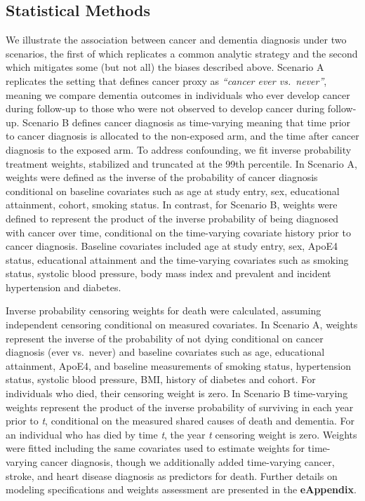 \documentclass[
]{book}
\begin{document}
\hypertarget{statistical-methods}{%
\subsection{Statistical Methods}\label{statistical-methods}}

We illustrate the association between cancer and dementia diagnosis under two scenarios, the first of which replicates a common analytic strategy and the second which mitigates some (but not all) the biases described above. Scenario A replicates the setting that defines cancer proxy as \emph{``cancer ever vs.~never''}\autocite{driver2012}, meaning we compare dementia outcomes in individuals who ever develop cancer during follow-up to those who were not observed to develop cancer during follow-up. Scenario B defines cancer diagnosis as time-varying meaning that time prior to cancer diagnosis is allocated to the non-exposed arm, and the time after cancer diagnosis to the exposed arm. To address confounding, we fit inverse probability treatment weights, stabilized and truncated at the 99th percentile. In Scenario A, weights were defined as the inverse of the probability of cancer diagnosis conditional on baseline covariates such as age at study entry, sex, educational attainment, cohort, smoking status. In contrast, for Scenario B, weights were defined to represent the product of the inverse probability of being diagnosed with cancer over time, conditional on the time-varying covariate history prior to cancer diagnosis\autocite{hernan2000}. Baseline covariates included age at study entry, sex, ApoE4 status, educational attainment and the time-varying covariates such as smoking status, systolic blood pressure, body mass index and prevalent and incident hypertension and diabetes.

Inverse probability censoring weights for death were calculated, assuming independent censoring conditional on measured covariates. In Scenario A, weights represent the inverse of the probability of not dying conditional on cancer diagnosis (ever vs.~never) and baseline covariates such as age, educational attainment, ApoE4, and baseline measurements of smoking status, hypertension status, systolic blood pressure, BMI, history of diabetes and cohort. For individuals who died, their censoring weight is zero\autocite{whatif2020}. In Scenario B time-varying weights represent the product of the inverse probability of surviving in each year prior to \emph{t}, conditional on the measured shared causes of death and dementia. For an individual who has died by time \emph{t}, the year \emph{t} censoring weight is zero\autocite{young2020}. Weights were fitted including the same covariates used to estimate weights for time-varying cancer diagnosis, though we additionally added time-varying cancer, stroke, and heart disease diagnosis as predictors for death. Further details on modeling specifications and weights assessment are presented in the \textbf{eAppendix}.
\end{document}

